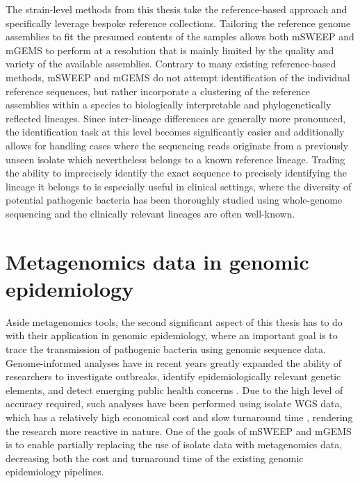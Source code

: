 \documentclass[officiallayout]{tktla}
\begin{document}
The strain-level methods from this thesis take the reference-based
approach and specifically leverage bespoke reference
collections. Tailoring the reference genome assemblies to fit the
presumed contents of the samples allows both mSWEEP and mGEMS to
perform at a resolution that is mainly limited by the quality and
variety of the available assemblies. Contrary to many existing
reference-based methods, mSWEEP and mGEMS do not attempt
identification of the individual reference sequences, but rather
incorporate a clustering of the reference assemblies within a species
to biologically interpretable and phylogenetically reflected
lineages. Since inter-lineage differences are generally more
pronounced, the identification task at this level becomes
significantly easier \citep{sankar2016bayesian} and additionally
allows for handling cases where the sequencing reads originate from a
previously unseen isolate which nevertheless belongs to a known
reference lineage. Trading the ability to imprecisely identify the
exact sequence to precisely identifying the lineage it belongs to is
especially useful in clinical settings, where the diversity of
potential pathogenic bacteria has been thoroughly studied using
whole-genome sequencing and the clinically relevant
lineages are often well-known.

\section{Metagenomics data in genomic epidemiology}

Aside metagenomics tools, the second significant aspect of this thesis
has to do with their application in genomic epidemiology, where an
important goal is to trace the transmission of pathogenic bacteria
using genomic sequence data. Genome-informed analyses have in recent
years greatly expanded the ability of researchers to investigate
outbreaks, identify epidemiologically relevant genetic elements, and
detect emerging public health concerns \citep{tang2017infection,
  van2019status, grad2014epidemiologic, kwong2015whole}. Due to the
high level of accuracy required, such analyses have been performed
using isolate WGS data, which has a relatively high economical cost
and slow turnaround time \citep{rossen2018practical}, rendering the
research more reactive in nature. One of the goals of mSWEEP and mGEMS
is to enable partially replacing the use of isolate data with
metagenomics data, decreasing both the cost and turnaround time of the
existing genomic epidemiology pipelines.
\end{document}
